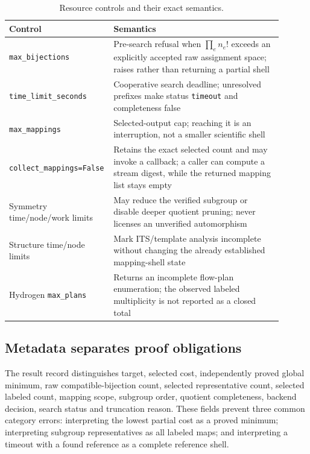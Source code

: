 \documentclass[11pt]{article}
\theoremstyle{definition}
\begin{document}
\begin{table}[ht]
\centering
\caption{Resource controls and their exact semantics.}
\begin{tabular}{>{\raggedright\arraybackslash}p{0.29\linewidth}
                >{\raggedright\arraybackslash}p{0.61\linewidth}}
\toprule
Control & Semantics \\
\midrule
\texttt{max\_bijections} & Pre-search refusal when
\(\prod_en_e!\) exceeds an explicitly accepted raw assignment space; raises
rather than returning a partial shell \\
\texttt{time\_limit\_seconds} & Cooperative search deadline; unresolved
prefixes make status \texttt{timeout} and completeness false \\
\texttt{max\_mappings} & Selected-output cap; reaching it is an interruption,
not a smaller scientific shell \\
\texttt{collect\_mappings=False} & Retains the exact selected count and may
invoke a callback; a caller can compute a stream digest, while the returned
mapping list stays empty \\
Symmetry time/node/work limits & May reduce the verified subgroup or disable
deeper quotient pruning; never licenses an unverified automorphism \\
Structure time/node limits & Mark ITS/template analysis incomplete without
changing the already established mapping-shell state \\
Hydrogen \texttt{max\_plans} & Returns an incomplete flow-plan enumeration;
the observed labeled multiplicity is not reported as a closed total \\
\bottomrule
\end{tabular}
\end{table}

\subsection{Metadata separates proof obligations}

The result record distinguishes target, selected cost, independently proved
global minimum, raw compatible-bijection count, selected representative count,
selected labeled count, mapping scope, subgroup order, quotient completeness,
backend decision, search status and truncation reason.  These fields prevent
three common category errors: interpreting the lowest partial cost as a proved
minimum; interpreting subgroup representatives as all labeled maps; and
interpreting a timeout with a found reference as a complete reference shell.
\end{document}
